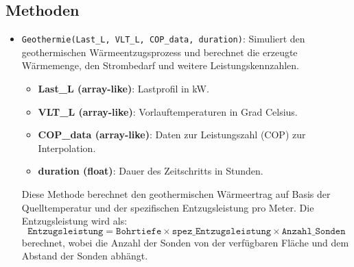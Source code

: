 \subsection{Methoden}
\begin{itemize}
    \item \texttt{Geothermie(Last\_L, VLT\_L, COP\_data, duration)}: Simuliert den geothermischen Wärmeentzugsprozess und berechnet die erzeugte Wärmemenge, den Strombedarf und weitere Leistungskennzahlen.
    \begin{itemize}
        \item \textbf{Last\_L (array-like)}: Lastprofil in kW.
        \item \textbf{VLT\_L (array-like)}: Vorlauftemperaturen in Grad Celsius.
        \item \textbf{COP\_data (array-like)}: Daten zur Leistungszahl (COP) zur Interpolation.
        \item \textbf{duration (float)}: Dauer des Zeitschritts in Stunden.
    \end{itemize}
    Diese Methode berechnet den geothermischen Wärmeertrag auf Basis der Quelltemperatur und der spezifischen Entzugsleistung pro Meter. Die Entzugsleistung wird als:
    \[
    \texttt{Entzugsleistung} = \texttt{Bohrtiefe} \times \texttt{spez\_Entzugsleistung} \times \texttt{Anzahl\_Sonden}
    \]
    berechnet, wobei die Anzahl der Sonden von der verfügbaren Fläche und dem Abstand der Sonden abhängt.
    

\end{itemize}
